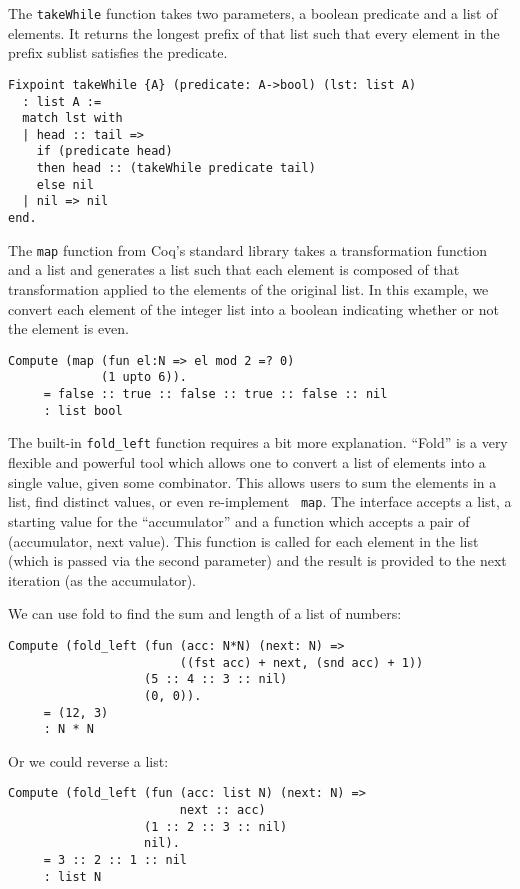 \documentclass[nocopyrightspace]{sigplanconf}
\begin{document}
The {\tt takeWhile} function takes two parameters, a boolean predicate and a
list of elements. It returns the longest prefix of that list such that every
element in the prefix sublist satisfies the predicate.

\begin{lstlisting}
Fixpoint takeWhile {A} (predicate: A->bool) (lst: list A)
  : list A :=
  match lst with
  | head :: tail => 
    if (predicate head) 
    then head :: (takeWhile predicate tail)
    else nil
  | nil => nil
end.
\end{lstlisting}

The {\tt map} function from Coq's standard library takes a transformation
function and a list and generates a list such that each element is composed of
that transformation applied to the elements of the original list. In this
example, we convert each element of the integer list into a boolean indicating
whether or not the element is even.

\begin{lstlisting}
Compute (map (fun el:N => el mod 2 =? 0)
             (1 upto 6)).
     = false :: true :: false :: true :: false :: nil
     : list bool
\end{lstlisting}

The built-in {\tt fold\_left} function requires a bit more explanation.
``Fold'' is a very flexible and powerful tool which allows one to convert a
list of elements into a single value, given some combinator. This allows users
to sum the elements in a list, find distinct values, or even re-implement {\tt
map}. The interface accepts a list, a starting value for the ``accumulator''
and a function which accepts a pair of (accumulator, next value). This
function is called for each element in the list (which is passed via the
second parameter) and the result is provided to the next iteration (as the
accumulator).

We can use fold to find the sum and length of a list of numbers:

\begin{lstlisting}
Compute (fold_left (fun (acc: N*N) (next: N) =>
                        ((fst acc) + next, (snd acc) + 1))
                   (5 :: 4 :: 3 :: nil)
                   (0, 0)).
     = (12, 3)
     : N * N
\end{lstlisting}

Or we could reverse a list:

\begin{lstlisting}
Compute (fold_left (fun (acc: list N) (next: N) =>
                        next :: acc)
                   (1 :: 2 :: 3 :: nil)
                   nil).
     = 3 :: 2 :: 1 :: nil
     : list N
\end{lstlisting}
\end{document}
